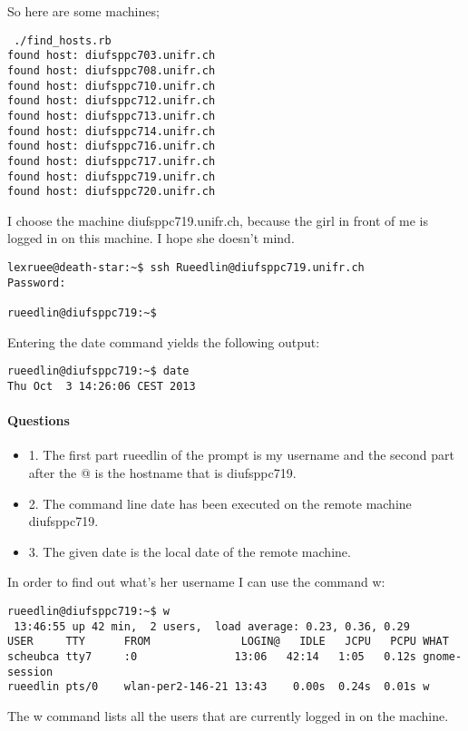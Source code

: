 \documentclass[12pt]{article}
\begin{document}
So here are some machines;
\begin{lstlisting}
 ./find_hosts.rb
found host: diufsppc703.unifr.ch
found host: diufsppc708.unifr.ch
found host: diufsppc710.unifr.ch
found host: diufsppc712.unifr.ch
found host: diufsppc713.unifr.ch
found host: diufsppc714.unifr.ch
found host: diufsppc716.unifr.ch
found host: diufsppc717.unifr.ch
found host: diufsppc719.unifr.ch
found host: diufsppc720.unifr.ch
\end{lstlisting}

I choose the machine diufsppc719.unifr.ch, because the girl in front of me is logged in on this machine. I hope she doesn't mind.

\begin{lstlisting}
lexruee@death-star:~$ ssh Rueedlin@diufsppc719.unifr.ch
Password:

rueedlin@diufsppc719:~$ 
\end{lstlisting}

Entering the date command yields the following output:
\begin{lstlisting}
rueedlin@diufsppc719:~$ date
Thu Oct  3 14:26:06 CEST 2013
\end{lstlisting}

\paragraph{Questions}
\begin{itemize}
\item 1. The first part rueedlin of the prompt is my username and the second part after the @ is the hostname that is diufsppc719.
\item 2. The command line date has been executed on the remote machine diufsppc719.
\item 3. The given date is the local date of the remote machine.
\end{itemize}

In order to find out what's her username I can use the command w:
\begin{lstlisting}
rueedlin@diufsppc719:~$ w
 13:46:55 up 42 min,  2 users,  load average: 0.23, 0.36, 0.29
USER     TTY      FROM              LOGIN@   IDLE   JCPU   PCPU WHAT
scheubca tty7     :0               13:06   42:14   1:05   0.12s gnome-session
rueedlin pts/0    wlan-per2-146-21 13:43    0.00s  0.24s  0.01s w
\end{lstlisting}

The w command lists all the users that are currently logged in on the machine.
\end{document}
